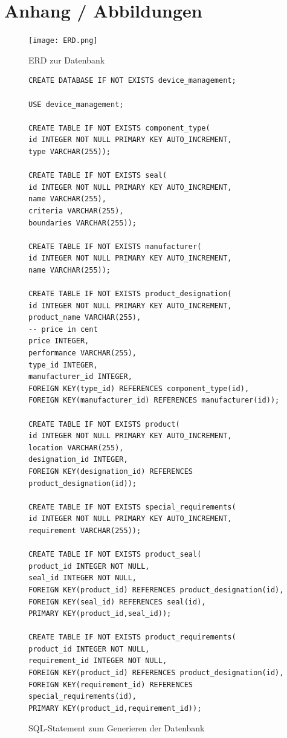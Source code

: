 \documentclass{article}
\begin{document}
\section{Anhang / Abbildungen}
\begin{figure}[htp]
\caption{ERD zur Datenbank}
\label{fig:erdDatabase}
\texttt{[image: ERD.png]}\par\vspace{1cm}
\end{figure}
\begin{figure}[!htbp]
\caption{SQL-Statement zum Generieren der Datenbank}
\label{fig:generateSql}
\begin{lstlisting}
CREATE DATABASE IF NOT EXISTS device_management;

USE device_management;

CREATE TABLE IF NOT EXISTS component_type(
id INTEGER NOT NULL PRIMARY KEY AUTO_INCREMENT, 
type VARCHAR(255));

CREATE TABLE IF NOT EXISTS seal(
id INTEGER NOT NULL PRIMARY KEY AUTO_INCREMENT, 
name VARCHAR(255),
criteria VARCHAR(255),
boundaries VARCHAR(255));

CREATE TABLE IF NOT EXISTS manufacturer(
id INTEGER NOT NULL PRIMARY KEY AUTO_INCREMENT, 
name VARCHAR(255));

CREATE TABLE IF NOT EXISTS product_designation(
id INTEGER NOT NULL PRIMARY KEY AUTO_INCREMENT, 
product_name VARCHAR(255),
-- price in cent
price INTEGER, 
performance VARCHAR(255),
type_id INTEGER,
manufacturer_id INTEGER,
FOREIGN KEY(type_id) REFERENCES component_type(id),
FOREIGN KEY(manufacturer_id) REFERENCES manufacturer(id));

CREATE TABLE IF NOT EXISTS product(
id INTEGER NOT NULL PRIMARY KEY AUTO_INCREMENT, 
location VARCHAR(255),
designation_id INTEGER,
FOREIGN KEY(designation_id) REFERENCES product_designation(id));

CREATE TABLE IF NOT EXISTS special_requirements(
id INTEGER NOT NULL PRIMARY KEY AUTO_INCREMENT, 
requirement VARCHAR(255));

CREATE TABLE IF NOT EXISTS product_seal(
product_id INTEGER NOT NULL, 
seal_id INTEGER NOT NULL,
FOREIGN KEY(product_id) REFERENCES product_designation(id),
FOREIGN KEY(seal_id) REFERENCES seal(id),
PRIMARY KEY(product_id,seal_id));

CREATE TABLE IF NOT EXISTS product_requirements(
product_id INTEGER NOT NULL, 
requirement_id INTEGER NOT NULL,
FOREIGN KEY(product_id) REFERENCES product_designation(id),
FOREIGN KEY(requirement_id) REFERENCES special_requirements(id),
PRIMARY KEY(product_id,requirement_id));
\end{lstlisting}
\end{figure}
\end{document}
